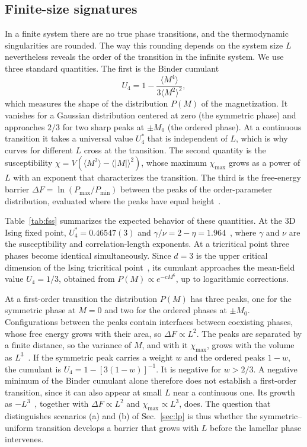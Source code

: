 \documentclass[aps,prd,twocolumn,superscriptaddress,nofootinbib,10pt]{revtex4-2}
\newcommand{\Ufour}{U_4}
\begin{document}
\subsection{Finite-size signatures}
\label{sec:fss}

In a finite system there are no true phase transitions, and the
thermodynamic singularities are rounded.  The way this rounding depends on
the system size $L$ nevertheless reveals the order of the transition in the
infinite system.  We use three standard quantities.  The first is the Binder
cumulant~\cite{Binder1981}
\begin{equation}
 \Ufour=1-\frac{\langle M^4\rangle}{3\langle M^2\rangle^2},
\end{equation}
which measures the shape of the distribution $P(M)$ of the magnetization.  It
vanishes for a Gaussian distribution centered at zero (the symmetric phase)
and approaches $2/3$ for two sharp peaks at $\pm M_0$ (the ordered phase).
At a continuous transition it takes a universal value $\Ufour^*$ that is
independent of $L$, which is why curves for different $L$ cross at the
transition.  The second quantity is the susceptibility
$\chi=V(\langle M^2\rangle-\langle|M|\rangle^2)$, whose maximum
$\chi_{\max}$ grows as a power of $L$ with an exponent that characterizes the
transition.  The third is the free-energy barrier
$\Delta F=\ln(P_{\max}/P_{\min})$ between the peaks of the order-parameter
distribution, evaluated where the peaks have equal height~\cite{Lee1990}.

Table~\ref{tab:fss} summarizes the expected behavior of these quantities.  At
the 3D Ising fixed point, $\Ufour^*=0.46547(3)$ and
$\gamma/\nu=2-\eta=1.964$~\cite{Hasenbusch2010}, where $\gamma$ and $\nu$ are
the susceptibility and correlation-length exponents.  At a tricritical point
three phases become identical simultaneously.  Since $d=3$ is the upper
critical dimension of the Ising tricritical point~\cite{Riedel1972,Deng2004},
its cumulant approaches the mean-field value $\Ufour=1/3$, obtained from
$P(M)\propto e^{-cM^6}$, up to logarithmic corrections.

At a first-order transition the distribution $P(M)$ has three peaks, one for
the symmetric phase at $M=0$ and two for the ordered phases at $\pm M_0$.
Configurations between the peaks contain interfaces between coexisting
phases, whose free energy grows with their area, so $\Delta F\propto L^2$.
The peaks are separated by a finite distance, so the variance of $M$, and with
it $\chi_{\max}$, grows with the volume as $L^3$~\cite{Challa1986,Lee1990}.
If the symmetric peak carries a weight $w$ and the ordered peaks $1-w$, the
cumulant is $\Ufour=1-[3(1-w)]^{-1}$.  It is negative for $w>2/3$.  A
negative minimum of the Binder cumulant alone therefore does not establish a
first-order transition, since it can also appear at small $L$ near a
continuous one.  Its growth as $-L^3$~\cite{Vollmayr1993}, together with
$\Delta F\propto L^2$ and $\chi_{\max}\propto L^3$, does.  The question that
distinguishes scenarios (a) and (b) of Sec.~\ref{sec:lp} is thus whether the
symmetric--uniform transition develops a barrier that grows with $L$ before
the lamellar phase intervenes.
\end{document}
